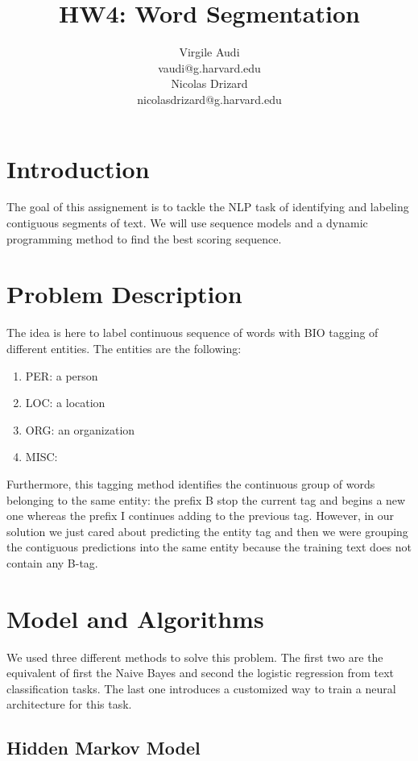 \documentclass[11pt]{article}
\title{HW4: Word Segmentation}
\author{Virgile Audi \\ vaudi@g.harvard.edu \\ Nicolas Drizard \\ nicolasdrizard@g.harvard.edu}
\begin{document}
\maketitle{}
\section{Introduction}

The goal of this assignement is to tackle the NLP task of identifying and labeling contiguous segments of text. We will use sequence models and a dynamic programming method to find the best scoring sequence.


\section{Problem Description}

The idea is here to label continuous sequence of words with BIO tagging of different entities. The entities are the following:

\begin{enumerate}
	\item PER: a person
	\item LOC: a location
	\item ORG: an organization
	\item MISC:
\end{enumerate}

Furthermore, this tagging method identifies the continuous group of words belonging to the same entity: the prefix B stop the current tag and begins a new one whereas the prefix I continues adding to the previous tag. However, in our solution we just cared about predicting the entity tag and then we were grouping the contiguous predictions into the same entity because the training text does not contain any B-tag.


\section{Model and Algorithms}

We used three different methods to solve this problem. The first two are the equivalent of first the Naive Bayes and second the logistic regression from text classification tasks. The last one introduces a customized way to train a neural architecture for this task.

\subsection{Hidden Markov Model}
\end{document}
